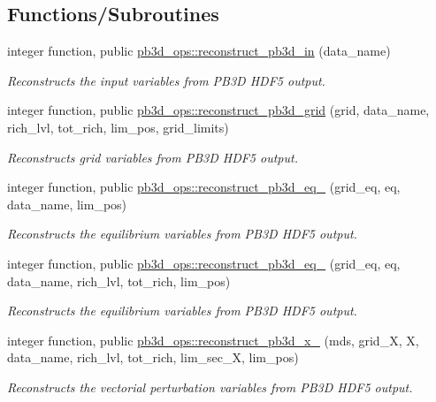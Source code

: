 \subsection*{Functions/\+Subroutines}
\begin{DoxyCompactItemize}
\item 
integer function, public \hyperlink{namespacepb3d__ops_ad1481747b9b9832f816d4bf1dd2d6737}{pb3d\+\_\+ops\+::reconstruct\+\_\+pb3d\+\_\+in} (data\+\_\+name)
\begin{DoxyCompactList}\small\item\em Reconstructs the input variables from P\+B3D H\+D\+F5 output. \end{DoxyCompactList}\item 
integer function, public \hyperlink{namespacepb3d__ops_a4218b582c5029ff05893265fa329877b}{pb3d\+\_\+ops\+::reconstruct\+\_\+pb3d\+\_\+grid} (grid, data\+\_\+name, rich\+\_\+lvl, tot\+\_\+rich, lim\+\_\+pos, grid\+\_\+limits)
\begin{DoxyCompactList}\small\item\em Reconstructs grid variables from P\+B3D H\+D\+F5 output. \end{DoxyCompactList}\item 
integer function, public \hyperlink{namespacepb3d__ops_a3142ca9965fa01b2777db762ed1a6eba}{pb3d\+\_\+ops\+::reconstruct\+\_\+pb3d\+\_\+eq\+\_} (grid\+\_\+eq, eq, data\+\_\+name, lim\+\_\+pos)
\begin{DoxyCompactList}\small\item\em Reconstructs the equilibrium variables from P\+B3D H\+D\+F5 output. \end{DoxyCompactList}\item 
integer function, public \hyperlink{namespacepb3d__ops_aaf99ae865680f4cf0a0a9932786689bf}{pb3d\+\_\+ops\+::reconstruct\+\_\+pb3d\+\_\+eq\+\_} (grid\+\_\+eq, eq, data\+\_\+name, rich\+\_\+lvl, tot\+\_\+rich, lim\+\_\+pos)
\begin{DoxyCompactList}\small\item\em Reconstructs the equilibrium variables from P\+B3D H\+D\+F5 output. \end{DoxyCompactList}\item 
integer function, public \hyperlink{namespacepb3d__ops_a8e87e553956f0dc4371d85b008e5e131}{pb3d\+\_\+ops\+::reconstruct\+\_\+pb3d\+\_\+x\+\_} (mds, grid\+\_\+X, X, data\+\_\+name, rich\+\_\+lvl, tot\+\_\+rich, lim\+\_\+sec\+\_\+X, lim\+\_\+pos)
\begin{DoxyCompactList}\small\item\em Reconstructs the vectorial perturbation variables from P\+B3D H\+D\+F5 output. \end{DoxyCompactList}\item 

\end{DoxyCompactItemize}

